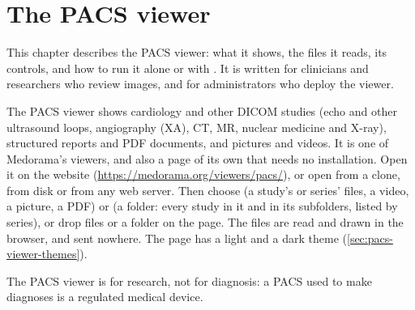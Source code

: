 \chapter{The PACS viewer}
\label{chap:pacs-viewer}

This chapter describes the PACS viewer: what it shows, the files it reads, its controls, and
how to run it alone or with . It is written for clinicians and researchers who
review images, and for administrators who deploy the viewer.

The PACS viewer shows cardiology and other DICOM studies (echo and other ultrasound loops,
angiography (XA), CT, MR, nuclear medicine and X-ray), structured reports and PDF documents, and
pictures and videos. It is one of Medorama's viewers, and also a page of its own that needs no
installation. Open it on the website (\url{https://medorama.org/viewers/pacs/}),
or open  from a clone, from disk or from any web server. Then choose
 (a study's or series' files, a video, a picture, a PDF) or
 (a folder: every study in it and in its subfolders, listed by
series), or drop files or a folder on the page. The files are read and drawn in the browser, and
sent nowhere. The page has a light and a dark theme (\cref{sec:pacs-viewer-themes}).

\begin{note}
The PACS viewer is for research, not for diagnosis: a PACS used to make diagnoses is a regulated
medical device.
\end{note}


